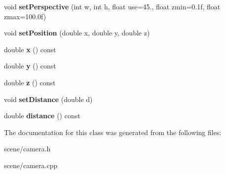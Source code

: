 \begin{DoxyCompactItemize}
\item 
\hypertarget{class_tempest_1_1_camera_ae49e2ccc417e30fd5f3789c313799a47}{void {\bfseries set\+Perspective} (int w, int h, float use=45., float zmin=0.\+1f, float zmax=100.\+0f)}\label{class_tempest_1_1_camera_ae49e2ccc417e30fd5f3789c313799a47}

\item 
\hypertarget{class_tempest_1_1_camera_a7c269eb6d37c53273435590e398880f9}{void {\bfseries set\+Position} (double x, double y, double z)}\label{class_tempest_1_1_camera_a7c269eb6d37c53273435590e398880f9}

\item 
\hypertarget{class_tempest_1_1_camera_a7b41b23ec5a1af3fd6940919831c4669}{double {\bfseries x} () const }\label{class_tempest_1_1_camera_a7b41b23ec5a1af3fd6940919831c4669}

\item 
\hypertarget{class_tempest_1_1_camera_a1c0b071cbcef5421f102eee20cfd3cb8}{double {\bfseries y} () const }\label{class_tempest_1_1_camera_a1c0b071cbcef5421f102eee20cfd3cb8}

\item 
\hypertarget{class_tempest_1_1_camera_ae588fa9fbb424d1c04c9b1026fe68f5d}{double {\bfseries z} () const }\label{class_tempest_1_1_camera_ae588fa9fbb424d1c04c9b1026fe68f5d}

\item 
\hypertarget{class_tempest_1_1_camera_a4e3d9d06d4cf59d5d49674bd3af57e61}{void {\bfseries set\+Distance} (double d)}\label{class_tempest_1_1_camera_a4e3d9d06d4cf59d5d49674bd3af57e61}

\item 
\hypertarget{class_tempest_1_1_camera_a260df29ca84b944cc3e6c1281b1a9caf}{double {\bfseries distance} () const }\label{class_tempest_1_1_camera_a260df29ca84b944cc3e6c1281b1a9caf}

\end{DoxyCompactItemize}


The documentation for this class was generated from the following files\+:\begin{DoxyCompactItemize}
\item 
scene/camera.\+h\item 
scene/camera.\+cpp\end{DoxyCompactItemize}
